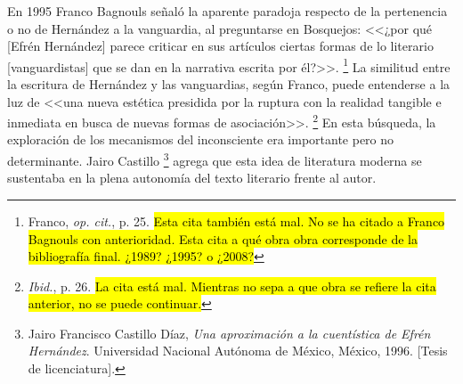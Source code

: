 \documentclass[14pt,twoside,final]{extbook} %
\let\oldfootnote\footnote
\renewcommand\footnote[1]{%
\oldfootnote{\hspace{1mm}#1}}
\begin{document}
En 1995 Franco Bagnouls señaló la aparente paradoja respecto de la pertenencia o no de Hernández a la vanguardia, al preguntarse en Bosquejos: <<¿por qué [Efrén Hernández] parece criticar en sus artículos ciertas formas de lo literario [vanguardistas] que se dan en la narrativa escrita por él?>>.\footnote{Franco, \emph{op. cit.}, p. 25. \hl{Esta cita también está mal. No se ha citado a Franco Bagnouls con anterioridad. Esta cita a qué obra obra corresponde de la bibliografía final. ¿1989? ¿1995? o ¿2008?}} La similitud entre la escritura de Hernández y las vanguardias, según Franco, puede entenderse a la luz de <<una nueva estética presidida por la ruptura con la realidad tangible e inmediata
en busca de nuevas formas de asociación>>.\footnote{\emph{Ibid.}, p. 26. \hl{La cita está mal. Mientras no sepa a que obra se refiere la cita anterior, no se puede continuar.}} En esta búsqueda, la exploración de los mecanismos del inconsciente era importante pero no determinante. Jairo Castillo\footnote{Jairo Francisco Castillo Díaz, \emph{Una aproximación a la cuentística de Efrén Hernández}. Universidad
Nacional Autónoma de México, México, 1996. [Tesis de licenciatura].} agrega que esta idea de literatura moderna se sustentaba en la plena autonomía del texto literario frente al autor.
\end{document}

